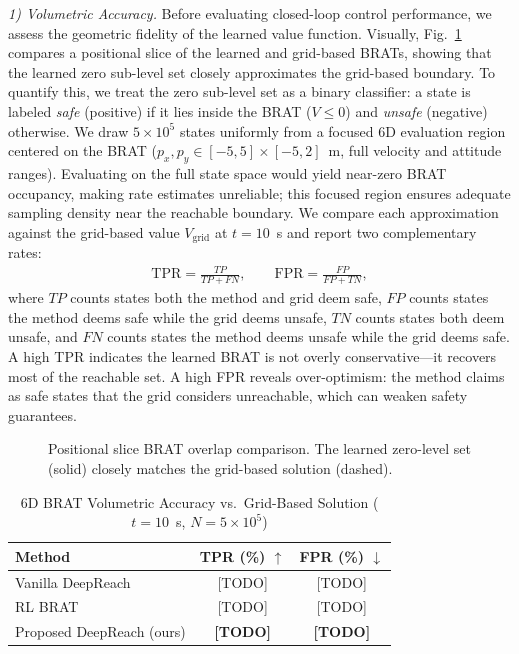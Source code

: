 \documentclass[letterpaper, 10 pt, conference]{ieeeconf}
\begin{document}
\textit{1) Volumetric Accuracy.}
Before evaluating closed-loop control performance, we assess the geometric fidelity of the learned value function. Visually, Fig.~\ref{fig:brat_overlap} compares a positional slice of the learned and grid-based BRATs, showing that the learned zero sub-level set closely approximates the grid-based boundary. To quantify this, we treat the zero sub-level set as a binary classifier: a state is labeled \emph{safe} (positive) if it lies inside the BRAT ($V \!\leq\! 0$) and \emph{unsafe} (negative) otherwise. We draw $5 \!\times\! 10^5$ states uniformly from a focused 6D evaluation region centered on the BRAT ($p_x, p_y \in [-5,5]\times[-5,2]$~m, full velocity and attitude ranges). Evaluating on the full state space would yield near-zero BRAT occupancy, making rate estimates unreliable; this focused region ensures adequate sampling density near the reachable boundary. We compare each approximation against the grid-based value $V_{\mathrm{grid}}$ at $t = 10$~s and report two complementary rates:
\begin{align}
  \mathrm{TPR} = \frac{TP}{TP + FN}, \qquad
  \mathrm{FPR} = \frac{FP}{FP + TN},
  \label{eq:tpr_fpr}
\end{align}
where $TP$ counts states both the method and grid deem safe, $FP$ counts states the method deems safe while the grid deems unsafe, $TN$ counts states both deem unsafe, and $FN$ counts states the method deems unsafe while the grid deems safe. A high TPR indicates the learned BRAT is not overly conservative---it recovers most of the reachable set. A high FPR reveals over-optimism: the method claims as safe states that the grid considers unreachable, which can weaken safety guarantees.

   \begin{figure}[t]
      \centering
      \caption{Positional slice BRAT overlap comparison. The learned zero-level set (solid) closely matches the grid-based solution (dashed).}
      \label{fig:brat_overlap}
   \end{figure}

\begin{table}[h]
\caption{6D BRAT Volumetric Accuracy vs.\ Grid-Based Solution ($t=10$~s, $N=5{\times}10^5$)}
\label{tab:volumetric}
\centering
\begin{tabular}{lcc}
\toprule
Method & TPR (\%) $\uparrow$ & FPR (\%) $\downarrow$ \\
\midrule
Vanilla DeepReach        & [TODO] & [TODO] \\
RL BRAT                  & [TODO] & [TODO] \\
Proposed DeepReach (ours) & \textbf{[TODO]} & \textbf{[TODO]} \\
\bottomrule
\end{tabular}
\end{table}
\end{document}
